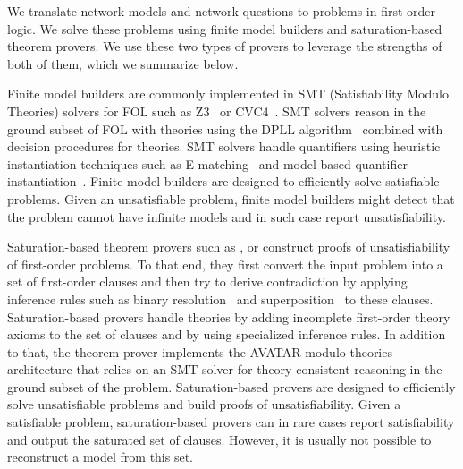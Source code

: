 
We translate network models and network questions to problems in first-order logic. We solve these problems using finite model builders and saturation-based theorem provers. We use these two types of provers to leverage the strengths of both of them, which we summarize below.

Finite model builders are commonly implemented in SMT (Satisfiability Modulo Theories) solvers for FOL such as Z3~\cite{Z3} or CVC4~\cite{CVC4}. SMT solvers reason in the ground subset of FOL with theories using the DPLL algorithm~\cite{davis1960computing} combined with decision procedures for theories. SMT solvers handle quantifiers using heuristic instantiation techniques such as E-matching~\cite{DBLP:journals/jacm/DetlefsNS05,DBLP:conf/cade/MouraB07} and model-based quantifier instantiation~\cite{DBLP:journals/jacm/DetlefsNS05,DBLP:conf/cade/MouraB07}. Finite model builders are designed to efficiently solve satisfiable problems. Given an unsatisfiable problem, finite model builders might detect that the problem cannot have infinite models and in such case report unsatisfiability.

Saturation-based theorem provers such as \eprover\cite{E13}, \spass\cite{Spass} or \vampire\cite{Vampire13} construct proofs of unsatisfiability of first-order problems. To that end, they first convert the input problem into a set of first-order clauses and then try to derive contradiction by applying inference rules such as binary resolution~\cite{Ganzinger01} and superposition~\cite{NieuwenhuisRubio:HandbookAR:paramodulation:2001} to these clauses.  Saturation-based provers handle theories by adding incomplete first-order theory axioms to the set of clauses and by using specialized inference rules. In addition to that, the \vampire theorem prover implements the AVATAR modulo theories~\cite{DBLP:conf/gcai/RegerB0V16} architecture that relies on an SMT solver for theory-consistent reasoning in the ground subset of the problem. Saturation-based provers are designed to efficiently solve unsatisfiable problems and build proofs of unsatisfiability. Given a satisfiable problem, saturation-based provers can in rare cases report satisfiability and output the saturated set of clauses. However, it is usually not possible to reconstruct a model from this set.

